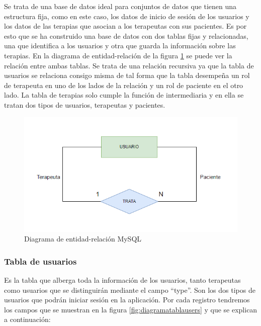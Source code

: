 Se trata de una base de datos ideal para conjuntos de datos que tienen una estructura fija, como en este caso, los datos de inicio de sesión de los usuarios y los datos de las terapias que asocian a los terapeutas con sus pacientes. Es por esto que se ha construido una base de datos con dos tablas fijas y relacionadas, una que identifica a los usuarios y otra que guarda la información sobre las terapias. En la diagrama de entidad-relación de la figura \ref{fig:diagramaEER} se puede ver la relación entre ambas tablas. Se trata de una relación recursiva ya que la tabla de usuarios se relaciona consigo misma de tal forma que la tabla desempeña un rol de terapeuta en uno de los lados de la relación y un rol de paciente en el otro lado. La tabla de terapias solo cumple la función de intermediaria y en ella se tratan dos tipos de usuarios, terapeutas y pacientes.

\begin{figure}[h]
	\centering
	\includegraphics[scale=1.0]{Imagenes/Vectorial/diagrama_entidad_relacion_mysql}
	\caption{Diagrama de entidad-relación MySQL}
	\label{fig:diagramaEER}
\end{figure}

\subsubsection{Tabla de usuarios}
Es la tabla que alberga toda la información de los usuarios, tanto terapeutas como usuarios que se distinguirán mediante el campo ``type''.
Son los dos tipos de usuarios que podrán iniciar sesión en la aplicación. Por cada registro tendremos los campos que se muestran en la figura \ref{fig:diagramatablausers} y que se explican a continuación:


